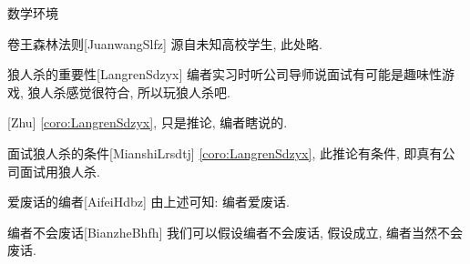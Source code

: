 \documentclass[hyperref, UTF8, CJK]{beamer}
\begin{document}
\begin{frame}{数学环境}
\begin{sculemma}{卷王森林法则}[JuanwangSlfz]
		源自未知高校学生, 此处略.
	\end{sculemma}
	\begin{scucorollary}{狼人杀的重要性}[LangrenSdzyx]
		编者实习时听公司导师说面试有可能是趣味性游戏, 狼人杀感觉很符合, 所以玩狼人杀吧.
	\end{scucorollary}
	\begin{scuremark}{}[Zhu]
		\vref{coro:LangrenSdzyx}, 只是推论, 编者瞎说的.
	\end{scuremark}
	\begin{scucondition}{面试狼人杀的条件}[MianshiLrsdtj]
		\vref{coro:LangrenSdzyx}, 此推论有条件, 即真有公司面试用狼人杀.
	\end{scucondition}
	\begin{scuconclusion}{爱废话的编者}[AifeiHdbz]
		由上述可知: 编者爱废话.
	\end{scuconclusion}
	\begin{scuassumption}{编者不会废话}[BianzheBhfh]
		我们可以假设编者不会废话, 假设成立, 编者当然不会废话.
	\end{scuassumption}
\end{frame}
\end{document}
